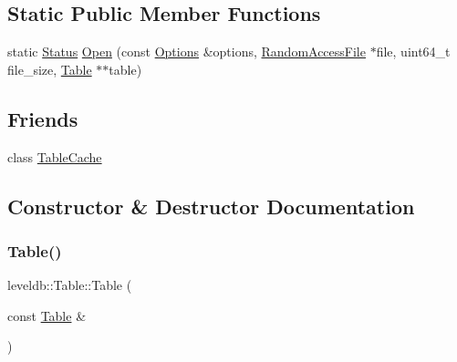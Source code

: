 \subsection*{Static Public Member Functions}
\begin{DoxyCompactItemize}
\item 
static \mbox{\hyperlink{classleveldb_1_1_status}{Status}} \mbox{\hyperlink{classleveldb_1_1_table_af9f2fb3a90cf32b5e39da910c5c37afb}{Open}} (const \mbox{\hyperlink{structleveldb_1_1_options}{Options}} \&options, \mbox{\hyperlink{classleveldb_1_1_random_access_file}{Random\+Access\+File}} $\ast$file, uint64\+\_\+t file\+\_\+size, \mbox{\hyperlink{classleveldb_1_1_table}{Table}} $\ast$$\ast$table)
\end{DoxyCompactItemize}
\subsection*{Friends}
\begin{DoxyCompactItemize}
\item 
class \mbox{\hyperlink{classleveldb_1_1_table_ae1e5f7bae4682672cfcc68d0add43199}{Table\+Cache}}
\end{DoxyCompactItemize}


\subsection{Constructor \& Destructor Documentation}
\mbox{\label{classleveldb_1_1_table_a7ad26fdc3703c49c6096bf08236b7a49}} 
\subsubsection{\texorpdfstring{Table()}{Table()}}
{\footnotesize\ttfamily leveldb\+::\+Table\+::\+Table (\begin{DoxyParamCaption}\item[{const \mbox{\hyperlink{classleveldb_1_1_table}{Table}} \&}]{ }\end{DoxyParamCaption})\hspace{0.3cm}{\ttfamily [delete]}}

\mbox{\label{classleveldb_1_1_table_a945f1f97b4f53402f5d55422a4dd3af2}} 

